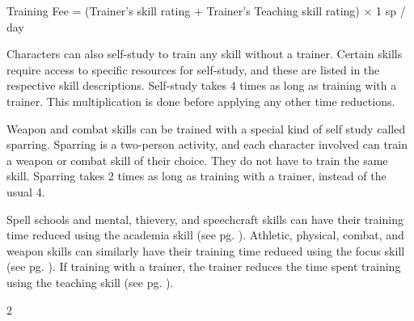 \begin{multicols}{2}
    \begin{center}
        Training Fee = (Trainer's skill rating + Trainer's Teaching skill rating) $\times$ 1 sp / day
    \end{center}

    Characters can also self-study to train any skill without a trainer.
    Certain skills require access to specific resources for self-study, and
    these are listed in the respective skill descriptions. Self-study takes 4
    times as long as training with a trainer. This multiplication is done
    before applying any other time reductions.

    Weapon and combat skills can be trained with a special kind of self study
    called sparring. Sparring is a two-person activity, and each character
    involved can train a weapon or combat skill of their choice. They do not
    have to train the same skill. Sparring takes 2 times as long as training
    with a trainer, instead of the usual 4.

    Spell schools and mental, thievery, and speechcraft skills can have their
    training time reduced using the academia skill (see pg. \pageref{skill:academia}).
    Athletic, physical, combat, and weapon skills can similarly have their training
    time reduced using the focus skill (see pg. \pageref{skill:focus}). If
    training with a trainer, the trainer reduces the time spent training using
    the teaching skill (see pg. \pageref{skill:teaching}).
\end{multicols}{2}

